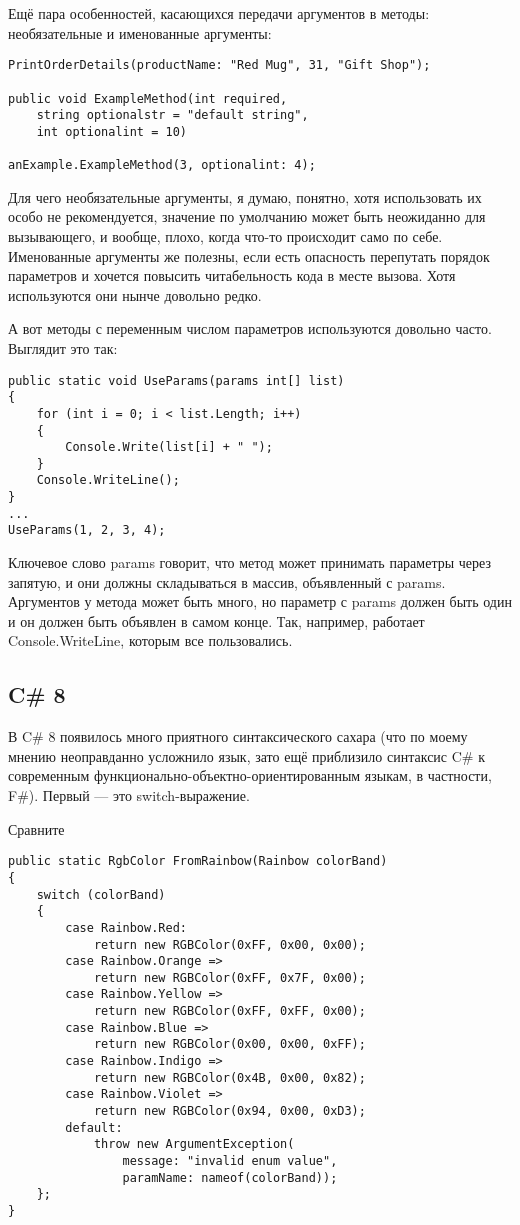 \documentclass{../../text-style}
\begin{document}
Ещё пара особенностей, касающихся передачи аргументов в методы: необязательные и именованные аргументы:

\begin{verbatim}
PrintOrderDetails(productName: "Red Mug", 31, "Gift Shop");

public void ExampleMethod(int required, 
    string optionalstr = "default string",
    int optionalint = 10)

anExample.ExampleMethod(3, optionalint: 4);
\end{verbatim}

Для чего необязательные аргументы, я думаю, понятно, хотя использовать их особо не рекомендуется, значение по умолчанию может быть неожиданно для вызывающего, и вообще, плохо, когда что-то происходит само по себе. Именованные аргументы же полезны, если есть опасность перепутать порядок параметров и хочется повысить читабельность кода в месте вызова. Хотя используются они нынче довольно редко.

А вот методы с переменным числом параметров используются довольно часто. Выглядит это так:

\begin{verbatim}
public static void UseParams(params int[] list)
{
    for (int i = 0; i < list.Length; i++)
    {
        Console.Write(list[i] + " ");
    }
    Console.WriteLine();
}
...
UseParams(1, 2, 3, 4);
\end{verbatim}

Ключевое слово params говорит, что метод может принимать параметры через запятую, и они должны складываться в массив, объявленный с params. Аргументов у метода может быть много, но параметр с params должен быть один и он должен быть объявлен в самом конце. Так, например, работает Console.WriteLine, которым все пользовались.

\subsection{C\# 8}

В C\# 8 появилось много приятного синтаксического сахара (что по моему мнению неоправданно усложнило язык, зато ещё приблизило синтаксис C\# к современным функционально-объектно-ориентированным языкам, в частности, F\#). Первый --- это switch-выражение.

Сравните

\begin{verbatim}
public static RgbColor FromRainbow(Rainbow colorBand)
{ 
    switch (colorBand)
    {
        case Rainbow.Red: 
            return new RGBColor(0xFF, 0x00, 0x00);
        case Rainbow.Orange => 
            return new RGBColor(0xFF, 0x7F, 0x00);
        case Rainbow.Yellow => 
            return new RGBColor(0xFF, 0xFF, 0x00);
        case Rainbow.Blue => 
            return new RGBColor(0x00, 0x00, 0xFF);
        case Rainbow.Indigo => 
            return new RGBColor(0x4B, 0x00, 0x82);
        case Rainbow.Violet => 
            return new RGBColor(0x94, 0x00, 0xD3);
        default:
            throw new ArgumentException(
                message: "invalid enum value",
                paramName: nameof(colorBand));
    };
}
\end{verbatim}
\end{document}
